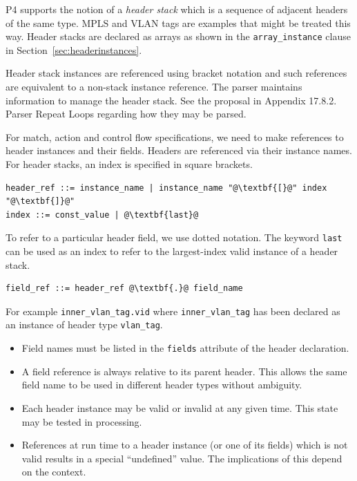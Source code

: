 \documentclass[12pt]{article}
\begin{document}

P4 supports the notion of a \textit{header stack} which is a sequence
of adjacent headers of the same type. MPLS and VLAN tags are examples
that might be treated this way.  Header stacks are declared as arrays
as shown in the \texttt{array_instance} clause in
Section~\ref{sec:headerinstances}.

Header stack instances are referenced using bracket notation and such
references are equivalent to a non-stack instance reference.  The
parser maintains information to manage the header stack. See the
proposal in Appendix 17.8.2. Parser Repeat Loops regarding how they
may be parsed.


For match, action and control flow specifications, we need to make
references to header instances and their fields. Headers are
referenced via their instance names.  For header stacks, an index is
specified in square brackets.

\begin{lstlisting}[frame=single,backgroundcolor=\color{bnfgreen},escapechar=\@]
header_ref ::= instance_name | instance_name "@\textbf{[}@" index "@\textbf{]}@"
index ::= const_value | @\textbf{last}@
\end{lstlisting}

To refer to a particular header field, we use dotted notation. The
keyword \texttt{last} can be used as an index to refer to the
largest-index valid instance of a header stack.

\begin{lstlisting}[frame=single,backgroundcolor=\color{bnfgreen},escapechar=\@]
field_ref ::= header_ref @\textbf{.}@ field_name
\end{lstlisting}

For example \texttt{inner_vlan_tag.vid} where
\texttt{inner_vlan_tag} has been declared as an instance of header
type \texttt{vlan_tag}.

\begin{itemize}
\item
Field names must be listed in the \texttt{fields} attribute of the
header declaration.
\item
A field reference is always relative to its parent header.  This allows the
same field name to be used in different header types without ambiguity.
\item
Each header instance may be valid or invalid at any given time. This state
may be tested in \matchaction processing.
\item
References at run time to a header instance (or one of its fields) which is
not valid results in a special ``undefined'' value.  The implications of this
depend on the context.
\end{itemize}
\end{document}
